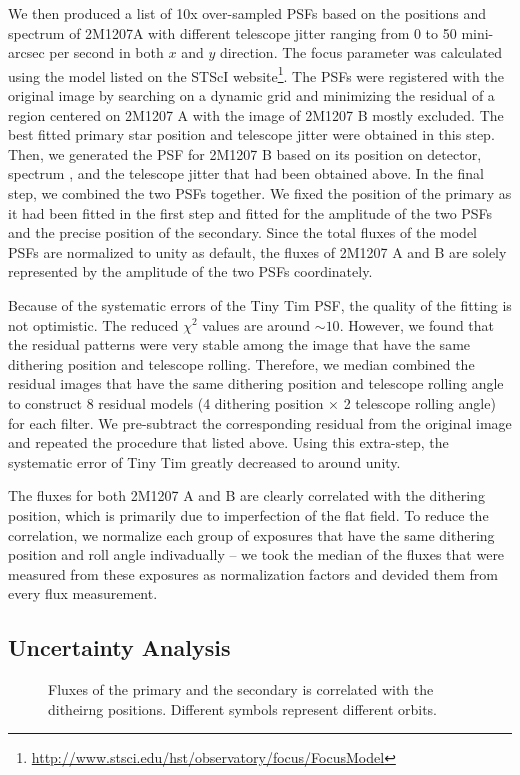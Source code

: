 \documentclass[apj]{emulateapj}
\begin{document}
We then produced a list of 10x over-sampled PSFs based on the
positions and spectrum \citep{Bonnefoy2014} of 2M1207A with different telescope jitter
ranging from 0 to 50 mini-arcsec per second in both $x$ and $y$
direction. The focus parameter was calculated using the model listed
on the STScI
website\footnote{\url{http://www.stsci.edu/hst/observatory/focus/FocusModel}}. The
PSFs were registered with the original image by searching on a dynamic
grid and minimizing the residual of a region centered on 2M1207 A with
the image of 2M1207 B mostly excluded. The best fitted primary star
position and telescope jitter were obtained in this step. Then, we
generated the PSF for 2M1207 B based on its position on detector,
spectrum \citep{Patience2010}, and the telescope jitter that had been obtained above. In
the final step, we combined the two PSFs together. We fixed the
position of the primary as it had been fitted in the first step and
fitted for the amplitude of the two PSFs and the precise position of
the secondary. Since the total fluxes of the model PSFs are normalized
to unity as default, the fluxes of 2M1207 A and B are solely
represented by the amplitude of the two PSFs coordinately.

Because of the systematic errors of the Tiny Tim PSF, the quality of the
fitting is not optimistic. The reduced $\chi^{2}$ values are around
$\sim10$. However, we found that the residual patterns were very
stable among the image that have the same dithering position and
telescope rolling. Therefore, we median combined the residual images
that have the same dithering position and telescope rolling angle to
construct 8 residual models (4 dithering position $\times$ 2 telescope
rolling angle) for each filter. We pre-subtract the corresponding
residual from the original image and repeated the procedure that
listed above. Using this extra-step, the systematic error of Tiny Tim
greatly decreased to around unity.

The fluxes for both 2M1207 A and B are clearly correlated with the
dithering position, which is primarily due to imperfection of the flat
field. To reduce the correlation, we normalize each group of exposures
that have the same dithering position and roll angle indivadually --
we took the median of the fluxes that were measured from these
exposures as normalization factors and devided them from every flux
measurement. 
\subsection{Uncertainty Analysis}
\begin{figure*}[h]
  \centering
  \caption{Fluxes of the primary and the secondary is correlated with
    the ditheirng positions. Different symbols represent different
    orbits.}
  \label{fig:fig2}
\end{figure*}
\end{document}
